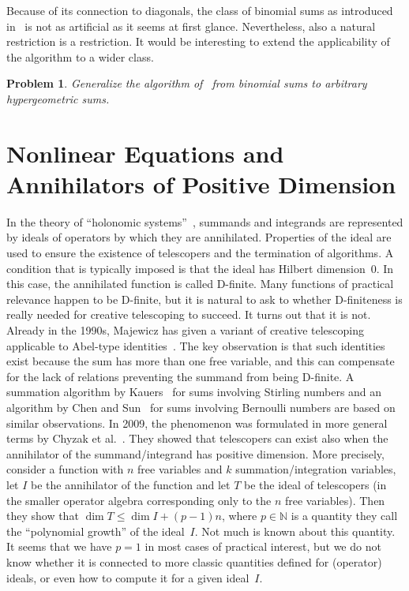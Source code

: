 \documentclass[a4paper,draft]{amsart}
\let\set\mathbb
\newtheorem{problem}{Problem}
\begin{document}
 Because of its connection to diagonals, the class of binomial sums as introduced in~\cite{bostan15}
 is not as artificial as it seems at first glance. Nevertheless, also a natural restriction
 is a restriction. It would be interesting to extend the applicability of the algorithm to
 a wider class.

 \begin{problem}
   Generalize the algorithm of~\cite{bostan15} from binomial sums to arbitrary hypergeometric
   sums.
 \end{problem}

%

 \section{Nonlinear Equations and Annihilators of Positive Dimension}

 In the theory of ``holonomic systems''~\cite{zeilberger90}, summands and
 integrands are represented by ideals of operators by which they are
 annihilated. Properties of the ideal are used to ensure the existence of
 telescopers and the termination of algorithms. A condition that is typically
 imposed is that the ideal has Hilbert dimension~$0$. In this case, the
 annihilated function is called D-finite.  Many functions of practical relevance
 happen to be D-finite, but it is natural to ask to whether D-finiteness is
 really needed for creative telescoping to succeed. It turns out that it is not.
 Already in the 1990s, Majewicz has given a variant of creative telescoping
 applicable to Abel-type identities~\cite{majewicz96}. The key observation is
 that such identities exist because the sum has more than one free variable, and
 this can compensate for the lack of relations preventing the summand from being
 D-finite. A summation algorithm by Kauers~\cite{kauers07n} for sums involving
 Stirling numbers and an algorithm by Chen and Sun~\cite{chen09} for sums
 involving Bernoulli numbers are based on similar observations. In 2009, the
 phenomenon was formulated in more general terms by Chyzak et
 al.~\cite{chyzak09a}. They showed that telescopers can exist also when the
 annihilator of the summand/integrand has positive dimension. More precisely,
 consider a function with $n$ free variables and $k$ summation/integration
 variables, let $I$ be the annihilator of the function and let $T$ be the ideal
 of telescopers (in the smaller operator algebra corresponding only to the $n$
 free variables). Then they show that $\dim T\leq\dim I + (p-1)n$, where
 $p\in\set N$ is a quantity they call the ``polynomial growth'' of the
 ideal~$I$. Not much is known about this quantity. It seems that we have $p=1$
 in most cases of practical interest, but we do not know whether it is connected
 to more classic quantities defined for (operator) ideals, or even how to
 compute it for a given ideal~$I$.
\end{document}
